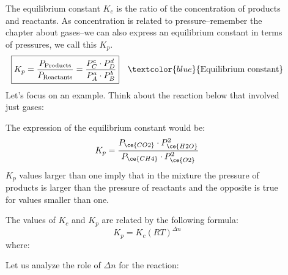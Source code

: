 \documentclass[main.tex]{subfiles}
\newcommand\chapterlabel{equilibrium}
\begin{document}
\begin{description}
\item[] 
The equilibrium constant $K_{c}$ is the ratio of the concentration of products and reactants. As concentration is related to pressure--remember the chapter about gases--we can also express an equilibrium constant in terms of pressures, we call this $K_{p}$.
\begin{equation}
\boxed{  K_{p}=\frac{P_{\text{Products}}}{P_{\text{Reactants}}}=\frac{P_{C}^c \cdot P_{D}^d} {P_{A}^a \cdot P_{B}^b} } \quad \textcolor{blue}{\text{Equilibrium constant}}
\label{\chapterlabel:equation2}
\end{equation}
Let's focus on an example. Think about the reaction below that involved just gases:
\begin{center}\end{center}
The expression of the equilibrium constant would be:
\begin{equation*}
  K_{p}=\frac{P_{\ce{CO2}} \cdot P_{\ce{H2O}}^2} {P_{\ce{CH4}} \cdot P_{\ce{O2}}^2} 
\end{equation*}
$K_{p}$ values larger than one imply that in the mixture the pressure of products is larger than the pressure of reactants and the opposite is true for values smaller than one.
\item[] 
The values of $K_{c}$ and $K_{p}$ are related by the following formula:
\begin{equation}
\boxed{  K_p=K_c (RT)^{\Delta n}}
\label{\chapterlabel:equation3}
\end{equation}
where:
Let us analyze the role of $\Delta n$ for the reaction:
\begin{center}\end{center}  

\end{description}
\end{document}
